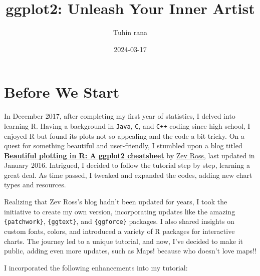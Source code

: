 \documentclass[
  letterpaper,
  DIV=11,
  numbers=noendperiod]{scrreprt}
\title{ggplot2: Unleash Your Inner Artist}
\author{Tuhin rana}
\date{2024-03-17}
\renewcommand*\contentsname{Table of contents}
\newcommand\contentsname{Table of contents}
\begin{document}
\maketitle

\renewcommand*\contentsname{Table of contents}
{
\hypersetup{linkcolor=}
\setcounter{tocdepth}{2}
\tableofcontents
}

\chapter*{Before We Start}\label{before-we-start}


In December 2017, after completing my first year of statistics, I delved
into learning R. Having a background in \texttt{Java}, \texttt{C}, and
\texttt{C++} coding since high school, I enjoyed R but found its plots
not so appealing and the code a bit tricky. On a quest for something
beautiful and user-friendly, I stumbled upon a blog titled
\href{http://zevross.com/blog/2014/08/04/beautiful-plotting-in-r-a-ggplot2-cheatsheet-3/}{\textbf{Beautiful
plotting in R: A ggplot2 cheatsheet}} by
\href{https://twitter.com/zevross}{Zev Ross}, last updated in January
2016. Intrigued, I decided to follow the tutorial step by step, learning
a great deal. As time passed, I tweaked and expanded the codes, adding
new chart types and resources.

Realizing that Zev Ross's blog hadn't been updated for years, I took the
initiative to create my own version, incorporating updates like the
amazing \texttt{\{patchwork\}}, \texttt{\{ggtext\}}, and
\texttt{\{ggforce\}} packages. I also shared insights on custom fonts,
colors, and introduced a variety of R packages for interactive charts.
The journey led to a unique tutorial, and now, I've decided to make it
public, adding even more updates, such as Maps! because who doesn't love
maps!!

I incorporated the following enhancements into my tutorial:
\end{document}
